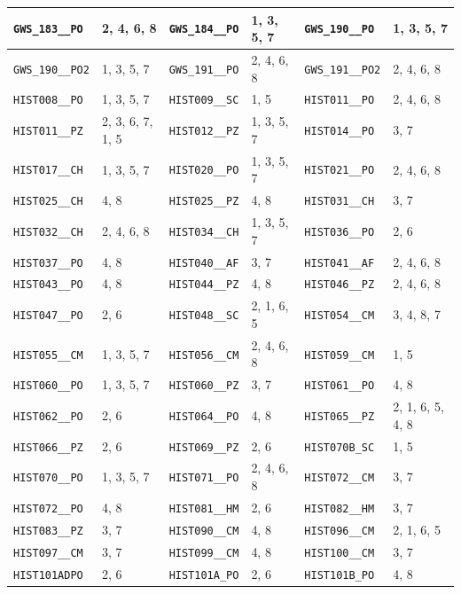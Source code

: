 \begin{longtable}{|l|l||l|l||l|l|}
    \verb|GWS_183__PO| & 2, 4, 6, 8 & \verb|GWS_184__PO| & 1, 3, 5, 7 & \verb|GWS_190__PO| & 1, 3, 5, 7\\\hline
    \verb|GWS_190__PO2| & 1, 3, 5, 7 & \verb|GWS_191__PO| & 2, 4, 6, 8 & \verb|GWS_191__PO2| & 2, 4, 6, 8\\\hline
    \verb|HIST008__PO| & 1, 3, 5, 7 & \verb|HIST009__SC| & 1, 5 & \verb|HIST011__PO| & 2, 4, 6, 8\\\hline
    \verb|HIST011__PZ| & 2, 3, 6, 7, 1, 5 & \verb|HIST012__PZ| & 1, 3, 5, 7 & \verb|HIST014__PO| & 3, 7\\\hline
    \verb|HIST017__CH| & 1, 3, 5, 7 & \verb|HIST020__PO| & 1, 3, 5, 7 & \verb|HIST021__PO| & 2, 4, 6, 8\\\hline
    \verb|HIST025__CH| & 4, 8 & \verb|HIST025__PZ| & 4, 8 & \verb|HIST031__CH| & 3, 7\\\hline
    \verb|HIST032__CH| & 2, 4, 6, 8 & \verb|HIST034__CH| & 1, 3, 5, 7 & \verb|HIST036__PO| & 2, 6\\\hline
    \verb|HIST037__PO| & 4, 8 & \verb|HIST040__AF| & 3, 7 & \verb|HIST041__AF| & 2, 4, 6, 8\\\hline
    \verb|HIST043__PO| & 4, 8 & \verb|HIST044__PZ| & 4, 8 & \verb|HIST046__PZ| & 2, 4, 6, 8\\\hline
    \verb|HIST047__PO| & 2, 6 & \verb|HIST048__SC| & 2, 1, 6, 5 & \verb|HIST054__CM| & 3, 4, 8, 7\\\hline
    \verb|HIST055__CM| & 1, 3, 5, 7 & \verb|HIST056__CM| & 2, 4, 6, 8 & \verb|HIST059__CM| & 1, 5\\\hline
    \verb|HIST060__PO| & 1, 3, 5, 7 & \verb|HIST060__PZ| & 3, 7 & \verb|HIST061__PO| & 4, 8\\\hline
    \verb|HIST062__PO| & 2, 6 & \verb|HIST064__PO| & 4, 8 & \verb|HIST065__PZ| & 2, 1, 6, 5, 4, 8\\\hline
    \verb|HIST066__PZ| & 2, 6 & \verb|HIST069__PZ| & 2, 6 & \verb|HIST070B_SC| & 1, 5\\\hline
    \verb|HIST070__PO| & 1, 3, 5, 7 & \verb|HIST071__PO| & 2, 4, 6, 8 & \verb|HIST072__CM| & 3, 7\\\hline
    \verb|HIST072__PO| & 4, 8 & \verb|HIST081__HM| & 2, 6 & \verb|HIST082__HM| & 3, 7\\\hline
    \verb|HIST083__PZ| & 3, 7 & \verb|HIST090__CM| & 4, 8 & \verb|HIST096__CM| & 2, 1, 6, 5\\\hline
    \verb|HIST097__CM| & 3, 7 & \verb|HIST099__CM| & 4, 8 & \verb|HIST100__CM| & 3, 7\\\hline
    \verb|HIST101ADPO| & 2, 6 & \verb|HIST101A_PO| & 2, 6 & \verb|HIST101B_PO| & 4, 8\\\hline

\end{longtable}
